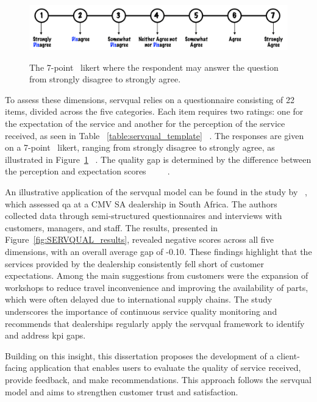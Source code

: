\begin{figure}[h]
  \caption{The 7-point ~\ac{likert} where the respondent may answer the question from strongly disagree to strongly agree. ~\cite{master_servqual_model}}
  \centering
  \includegraphics[width=\textwidth]{figs/likert_scale}
  \label{fig:likert_scale}
\end{figure}


To assess these dimensions, \ac{servqual} relies on a questionnaire consisting of 22 items, divided across the five categories. Each item requires two ratings: one for the expectation of the service and another for the perception of the service received, as seen in Table ~\ref{table:servqual_template} ~\cite{SERVQUAL_OLD}. The responses are given on a 7-point ~\ac{likert}, ranging from strongly disagree to strongly agree, as illustrated in Figure~\ref{fig:likert_scale} ~\cite{Measuring_After_sales_Service_Quality}. The quality gap is determined by the difference between the perception and expectation scores ~\cite{servqual_blog_da_qualidade} ~\cite{Measuring_After_sales_Service_Quality} ~\cite{SERVQUAL_OLD}.

An illustrative application of the \ac{servqual} model can be found in the study by ~\citet{Measuring_After_sales_Service_Quality}, which assessed \acs{qa} at a CMV SA dealership in South Africa. The authors collected data through semi-structured questionnaires and interviews with customers, managers, and staff. The results, presented in Figure~\ref{fig:SERVQUAL_results}, revealed negative scores across all five dimensions, with an overall average gap of -0.10. These findings highlight that the services provided by the dealership consistently fell short of customer expectations. Among the main suggestions from customers were the expansion of workshops to reduce travel inconvenience and improving the availability of parts, which were often delayed due to international supply chains. The study underscores the importance of continuous service quality monitoring and recommends that dealerships regularly apply the \ac{servqual} framework to identify and address \acs{kpi} gaps.

Building on this insight, this dissertation proposes the development of a client-facing application that enables users to evaluate the quality of service received, provide feedback, and make recommendations. This approach follows the \ac{servqual} model and aims to strengthen customer trust and satisfaction.


